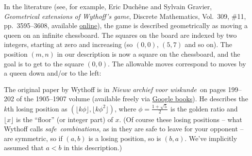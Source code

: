 \documentclass[12pt,letterpaper]{article}
\begin{document}
\begin{enumerate}
  In the literature (see, for example, Eric Duch\^ene and Sylvain
  Gravier, \emph{Geometrical extensions of Wythoff's game}, Discrete
  Mathematics, Vol.\ 309, \#11, pp.\ 3595--3608, available
  \href{http://www.sciencedirect.com.ezp-prod1.hul.harvard.edu/science/article/pii/S0012365X07010710}{online}),
  the game is described geometrically as moving a queen on an infinite
  chessboard.  The squares on the board are indexed by two integers,
  starting at zero and increasing (so $(0,0)$, $(5,7)$ and so on).
  The position $(m,n)$ in our description is now a square on the
  chessboard, and the goal is to get to the square $(0,0)$.  The
  allowable moves correspond to moves by a queen down and/or to the
  left:
  \begin{center}
  \end{center}
  The original paper by Wythoff is in \emph{Nieuw archief voor
    wiskunde}\ on pages 199--202 of the 1905--1907 volume (available
  freely via
  \href{https://books.google.com/books?id=4ucKAAAAYAAJ}{Google
    books}).  He describes the $k$th losing position as $(\lfloor
  k\phi\rfloor, \lfloor k\phi^2\rfloor )$, where
  $\phi=\frac{1+\sqrt{5}}{2}$ is the golden ratio and $\lfloor
  x\rfloor$ is the ``floor'' (or integer part) of $x$.  (Of course
  these losing positions -- what Wythoff calls \emph{safe\
    combinations}, as in they are safe to leave for your opponent --
  are symmetric, so if $(a,b)$ is a losing position, so is $(b,a)$.
  We've implicitly assumed that $a<b$ in this description.)



\end{enumerate}
\end{document}

